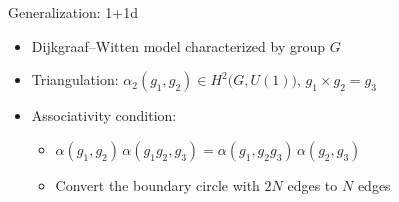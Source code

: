 \documentclass{fdubeamer}
\newcommand{\tikzinput}[1]{}
\newcommand{\1}{\mathbb{1}}
\begin{document}
\begin{frame}{Generalization: 1+1d}

\begin{itemize}
  \item Dijkgraaf--Witten model characterized by group $G$
  \item Triangulation: $\alpha_2(g_1, g_2) \in H^2 \bigl(G, U(1)\bigr), \, g_1 \times g_2 = g_3$
  \item Associativity condition:

    \begin{itemize}
      \item $\alpha(g_1, g_2) \, \alpha(g_1 g_2, g_3) = \alpha(g_1, g_2 g_3) \, \alpha(g_2, g_3)$ \quad
        \begingroup
          \tikzset{x=0.6em, y=0.6em}
          \tikzinput{associativity-condition}
        \endgroup
      \item Convert the boundary circle with $2N$ edges to $N$ edges
    \end{itemize}
\end{itemize}

\begin{center}
  \scriptsize
  \tikzset{x=1em, y=1em, node font=\tiny}
  \tikzinput{rg-1+1d-disk}
\end{center}


\end{frame}
\end{document}
